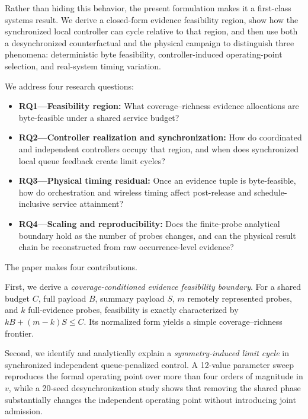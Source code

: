 \documentclass[10pt,journal]{IEEEtran}
\begin{document}
Rather than hiding this behavior, the present formulation makes it a first-class systems
result. We derive a closed-form evidence feasibility region, show how
the synchronized local controller can cycle relative to that region,
and then use both a desynchronized counterfactual and the physical
campaign to distinguish three phenomena: deterministic byte feasibility,
controller-induced operating-point selection, and real-system timing
variation.

We address four research questions:

\begin{itemize}[leftmargin=1.25em]
\item \textbf{RQ1---Feasibility region:}
What coverage--richness evidence allocations are byte-feasible under a
shared service budget?

\item \textbf{RQ2---Controller realization and synchronization:}
How do coordinated and independent controllers occupy that region, and
when does synchronized local queue feedback create limit cycles?

\item \textbf{RQ3---Physical timing residual:}
Once an evidence tuple is byte-feasible, how do orchestration and
wireless timing affect post-release and schedule-inclusive service
attainment?

\item \textbf{RQ4---Scaling and reproducibility:}
Does the finite-probe analytical boundary hold as the number of probes
changes, and can the physical result chain be reconstructed from raw
occurrence-level evidence?
\end{itemize}

The paper makes four contributions.

First, we derive a \emph{coverage-conditioned evidence feasibility
boundary}. For a shared budget $C$, full payload $B$, summary payload
$S$, $m$ remotely represented probes, and $k$ full-evidence probes,
feasibility is exactly characterized by
$kB+(m-k)S\leq C$. Its normalized form yields a simple
coverage--richness frontier.

Second, we identify and analytically explain a
\emph{symmetry-induced limit cycle} in synchronized independent
queue-penalized control. A 12-value parameter sweep reproduces the
formal operating point over more than four orders of magnitude in $v$,
while a 20-seed desynchronization study shows that removing the shared
phase substantially changes the independent operating point without
introducing joint admission.
\end{document}
